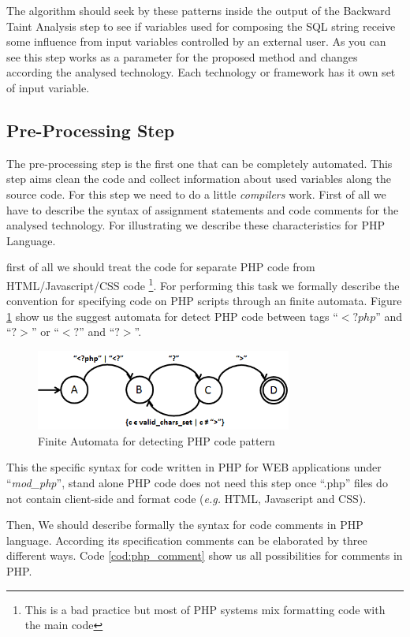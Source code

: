 The algorithm should seek by these patterns inside the output of the Backward Taint Analysis step to see if variables used for composing the SQL string receive some influence from input variables controlled by an external user. As you can see this step works as a parameter for the proposed method and changes according the analysed technology. Each technology or framework has it own set of input variable.    

\subsection{Pre-Processing Step}
The pre-processing step is the first one that can be completely automated. This step aims clean the code and collect information about used variables along the source code. For this step we need to do a little \textit{compilers} work. First of all we have to describe the syntax of assignment statements and code comments for the analysed technology. For illustrating we describe these characteristics for PHP Language.

first of all we should treat the code for separate PHP code from HTML/Javascript/CSS code \footnote{This is a bad practice but most of PHP systems mix formatting code with the main code}. For performing this task we formally describe the convention for specifying code on PHP scripts through an finite automata. Figure \ref{fig:php_code_automata} show us the suggest automata for detect PHP code between tags ``$<?php$'' and ``$?>$'' or ``$<?$'' and ``$?>$''.

\begin{figure}[ht]
\centering
\includegraphics[width=0.75\textwidth]{image/automata.png}
\caption{Finite Automata for detecting PHP code pattern}
\label{fig:php_code_automata}
\end{figure}

This the specific syntax for code written in PHP for WEB applications under ``\textit{mod\_php}'', stand alone PHP code does not need this step once  ``.php'' files do not contain client-side and format code (\textit{e.g.} HTML, Javascript and CSS). 

Then, We should describe formally the syntax for code comments in PHP language. According its specification comments can be elaborated by three different ways. Code \ref{cod:php_comment} show us all possibilities for comments in PHP.

